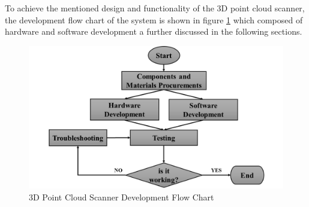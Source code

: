 To achieve the mentioned design and functionality of the 3D point cloud scanner, the development flow chart of the system is shown in figure \ref{ch3:fig:3d-pcss_development_flow_chart} which composed of hardware and software development a further discussed in the following sections.


\begin{figure}[H]
	\centering
	\includegraphics[width=1\textwidth]{Figures/hardware_flowchart}
	\caption{3D Point Cloud Scanner Development Flow Chart}
	\label{ch3:fig:3d-pcss_development_flow_chart}
\end{figure}


